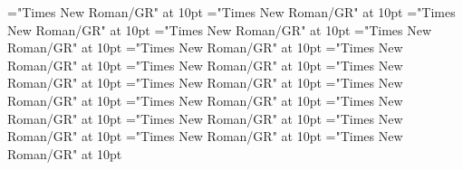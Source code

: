 \documentclass[a4paper]{article}
\begin{document}
\font\translationtranslationsexampleexamplessensesensecontentsensesentryletData="Times New Roman/GR" at 10pt
\font\translationtranslationtranslationsexampleexamplessensesensecontentsensesentryletData="Times New Roman/GR" at 10pt
\font\spanentranslationtranslationtranslationsexampleexamplessensesensecontentsensesentryletData="Times New Roman/GR" at 10pt
\font\semanticdomainssensesensecontentsensesentryletData="Times New Roman/GR" at 10pt
\font\semanticdomainsemanticdomainssensesensecontentsensesentryletData="Times New Roman/GR" at 10pt
\font\abbreviationsemanticdomainsemanticdomainssensesensecontentsensesentryletData="Times New Roman/GR" at 10pt
\font\spanenabbreviationsemanticdomainsemanticdomainssensesensecontentsensesentryletData="Times New Roman/GR" at 10pt
\font\namesemanticdomainsemanticdomainssensesensecontentsensesentryletData="Times New Roman/GR" at 10pt
\font\spanennamesemanticdomainsemanticdomainssensesensecontentsensesentryletData="Times New Roman/GR" at 10pt
\font\picturesentryletData="Times New Roman/GR" at 10pt
\font\picturepicturesentryletData="Times New Roman/GR" at 10pt
\font\thumbnailpicturepicturesentryletData="Times New Roman/GR" at 10pt
\font\sensenumberpicturepicturesentryletData="Times New Roman/GR" at 10pt
\font\spanensensenumberpicturepicturesentryletData="Times New Roman/GR" at 10pt
\font\captionpicturepicturesentryletData="Times New Roman/GR" at 10pt
\font\captioncaptionpicturepicturesentryletData="Times New Roman/GR" at 10pt
\font\spanencaptioncaptionpicturepicturesentryletData="Times New Roman/GR" at 10pt
\end{document}
